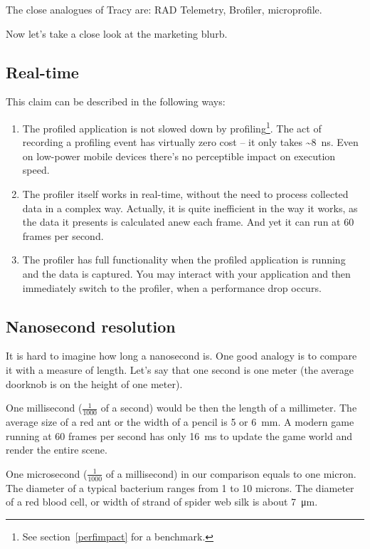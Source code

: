 \documentclass[hidelinks,titlepage,a4paper]{article}
\begin{document}
The close analogues of Tracy are: RAD Telemetry, Brofiler, microprofile.

Now let's take a close look at the marketing blurb.

\subsection{Real-time}

This claim can be described in the following ways:

\begin{enumerate}
\item The profiled application is not slowed down by profiling\footnote{See section~\ref{perfimpact} for a benchmark.}. The act of recording a profiling event has virtually zero cost -- it only takes \textasciitilde 8~\si{\nano\second}. Even on low-power mobile devices there's no perceptible impact on execution speed.
\item The profiler itself works in real-time, without the need to process collected data in a complex way. Actually, it is quite inefficient in the way it works, as the data it presents is calculated anew each frame. And yet it can run at 60 frames per second.
\item The profiler has full functionality when the profiled application is running and the data is captured. You may interact with your application and then immediately switch to the profiler, when a performance drop occurs.
\end{enumerate}

\subsection{Nanosecond resolution}

It is hard to imagine how long a nanosecond is. One good analogy is to compare it with a measure of length. Let's say that one second is one meter (the average doorknob is on the height of one meter).

One millisecond ($\frac{1}{1000}$ of a second) would be then the length of a millimeter. The average size of a red ant or the width of a pencil is 5 or 6~\si{\milli\metre}. A modern game running at 60 frames per second has only 16~\si{\milli\second} to update the game world and render the entire scene.

One microsecond ($\frac{1}{1000}$ of a millisecond) in our comparison equals to one micron. The diameter of a typical bacterium ranges from 1 to 10 microns. The diameter of a red blood cell, or width of strand of spider web silk is about 7~\si{\micro\metre}.
\end{document}

